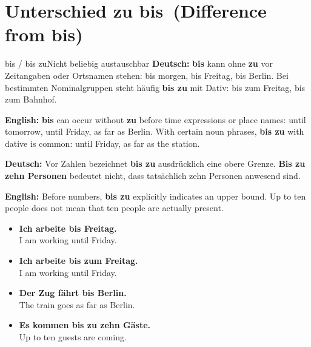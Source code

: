 \documentclass[a4paper,11pt]{article}
\newcommand{\GermanText}[1]{\textbf{Deutsch: }#1\par}
\newcommand{\EnglishText}[1]{{\small\color{SoftGray}\textbf{English: }#1\par}}
\newcommand{\ExampleItem}[2]{\item \textbf{#1}\\{\small\color{SoftGray}#2}}
\begin{document}
   \section{Unterschied zu \glqq bis\grqq\ (Difference from bis)}
      \begin{grammarentry}{bis / bis zu}{Nicht beliebig austauschbar}
         \GermanText{\textbf{bis} kann ohne \textbf{zu} vor Zeitangaben oder Ortsnamen stehen: \glqq bis morgen\grqq, \glqq bis Freitag\grqq, \glqq bis Berlin\grqq. Bei bestimmten Nominalgruppen steht häufig \textbf{bis zu} mit Dativ: \glqq bis zum Freitag\grqq, \glqq bis zum Bahnhof\grqq.}
         \EnglishText{\textbf{bis} can occur without \textbf{zu} before time expressions or place names: until tomorrow, until Friday, as far as Berlin. With certain noun phrases, \textbf{bis zu} with dative is common: until Friday, as far as the station.}
         \GermanText{Vor Zahlen bezeichnet \textbf{bis zu} ausdrücklich eine obere Grenze. \textbf{Bis zu zehn Personen} bedeutet nicht, dass tatsächlich zehn Personen anwesend sind.}
         \EnglishText{Before numbers, \textbf{bis zu} explicitly indicates an upper bound. Up to ten people does not mean that ten people are actually present.}
      \end{grammarentry}
      \begin{exbox}
         \begin{itemize}
            \ExampleItem{Ich arbeite bis Freitag.}{I am working until Friday.}
            \ExampleItem{Ich arbeite bis zum Freitag.}{I am working until Friday.}
            \ExampleItem{Der Zug fährt bis Berlin.}{The train goes as far as Berlin.}
            \ExampleItem{Es kommen bis zu zehn Gäste.}{Up to ten guests are coming.}
         \end{itemize}
      \end{exbox}
\end{document}
